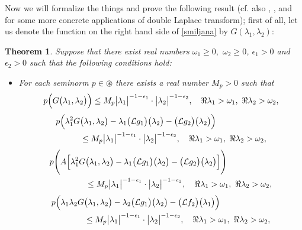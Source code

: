 \documentclass{amsart}
\newtheorem{thm}{Theorem}[section]
\theoremstyle{definition}
\theoremstyle{remark}
\numberwithin{equation}{section}
\begin{document}
Now we will formalize the things and prove the following result (cf. also \cite[Chapter 4]{thesis0}, \cite[Section 3]{baba}, \cite[Section 3]{dahija} and \cite[Section V(B)]{thesis1} for some more concrete applications of double Laplace transform); first of all, let us denote the function on the right hand side of \eqref{smiljana} by $G(\lambda_{1},\lambda_{2})$:

\begin{thm}\label{nm}
Suppose that there exist real numbers $\omega_{1}\geq 0,$ $\omega_{2}\geq 0$, $\epsilon_{1}>0$ and $\epsilon_{2}>0$ such that the following conditions hold:
\begin{itemize}
\item[(i)] For each seminorm $p\in \circledast$ there exists a real number $M_{p}>0$ such that 
\begin{align}\label{ok}
p\Bigl( G\bigl(\lambda_{1},\lambda_{2}\bigr)\Bigr) \leq M_{p}  \bigl| \lambda_{1}\bigr|^{-1-\epsilon_{1}} \cdot \bigl| \lambda_{2}\bigr|^{-1-\epsilon_{2}} , \quad \Re \lambda_{1} >\omega_{1},\ \Re \lambda_{2}>\omega_{2},
\end{align}
\begin{align}\notag 
p\Bigl( \lambda_{1}^{2} G& \bigl(\lambda_{1},\lambda_{2}\bigr)-\lambda_{1}\bigl({\mathcal L} g_{1}\bigr)\bigl( \lambda_{2} \bigr)-\bigl({\mathcal L} g_{2}\bigr)\bigl( \lambda_{2} \bigr)\Bigr) 
\\\label{ok1}& \leq M_{p}  \bigl| \lambda_{1}\bigr|^{-1-\epsilon_{1}} \cdot \bigl| \lambda_{2}\bigr|^{-1-\epsilon_{2}} , \quad \Re \lambda_{1} >\omega_{1},\ \Re \lambda_{2}>\omega_{2},
\end{align}
\begin{align}\notag 
p\Biggl( A\Bigl[\lambda_{1}^{2} G&\bigl(\lambda_{1},\lambda_{2}\bigr)-\lambda_{1}\bigl({\mathcal L} g_{1}\bigr)\bigl( \lambda_{2} \bigr)-\bigl({\mathcal L} g_{2}\bigr)\bigl( \lambda_{2} \bigr)\Bigr]\Biggr) 
\\\label{ok11}& \leq M_{p}  \bigl| \lambda_{1}\bigr|^{-1-\epsilon_{1}} \cdot \bigl| \lambda_{2}\bigr|^{-1-\epsilon_{2}} , \quad \Re \lambda_{1} >\omega_{1},\ \Re \lambda_{2}>\omega_{2},
\end{align}
\begin{align}\notag 
p\Bigl( \lambda_{1}\lambda_{2} G& \bigl(\lambda_{1},\lambda_{2}\bigr)-\lambda_{2}\bigl({\mathcal L} g_{1}\bigr)\bigl( \lambda_{2} \bigr)-\bigl({\mathcal L} f_{2}\bigr)\bigl( \lambda_{1} \bigr)\Bigr) 
\\\label{ok2}& \leq M_{p}  \bigl| \lambda_{1}\bigr|^{-1-\epsilon_{1}} \cdot \bigl| \lambda_{2}\bigr|^{-1-\epsilon_{2}} , \quad \Re \lambda_{1} >\omega_{1},\ \Re \lambda_{2}>\omega_{2},

\end{align}
\end{itemize}
\end{thm}
\end{document}
